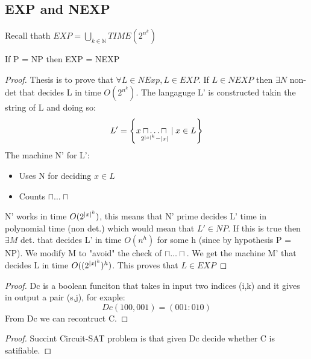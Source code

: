 \subsection*{EXP and NEXP}
Recall thath $EXP = \bigcup_{k \in \mathbb{N}}{TIME(2^{n^k})}$
\begin{theorem}
    If P = NP then EXP = NEXP
    \begin{proof}
        Thesis is to prove that $\forall L \in NExp, L \in EXP$. If $L \in NEXP$ then $\exists N$ non-det that decides L in time $O(2^{n^k})$. The langaguge L' is constructed takin the string of L and doing so:
        \[ 
            L' = \left\{ x \underset{2^{\left\lvert x\right\rvert^k}-\left\lvert x\right\rvert}{\sqcap \ldots \sqcap} \mid x \in L \right\}
        \]
        The machine N' for L':
        \begin{itemize}
            \item Uses N for deciding $x\in L$
            \item Counts $\sqcap \ldots \sqcap$
        \end{itemize} N' works in time $O(2^{\left\lvert x\right\rvert^k})$, this means that N' prime decides L' time in polynomial time (non det.) which would mean that $L' \in NP$. If this is true then $\exists M $ det. that decides L' in time $O(n^h)$ for some h (since by hypothesis P = NP). We modify M to "avoid" the check of $\sqcap \ldots \sqcap$. We get the machine M' that decides L in time $O((2^{\left\lvert x\right\rvert^k})^h)$. This proves that $L \in EXP$
    \end{proof}
\end{theorem}

\begin{theorem}
    \begin{proof}
        Dc is a boolean funciton that takes in input two indices (i,k) and it gives in output a pair (s,j), for exaple:
        \[ 
            Dc(100, 001) = (001: 010) 
        \]From Dc we can recontruct C. 
    \end{proof}
\end{theorem}

\begin{theorem}
    \begin{proof}
        Succint Circuit-SAT problem is that given Dc decide whether C is satifiable.
    \end{proof}
\end{theorem}





